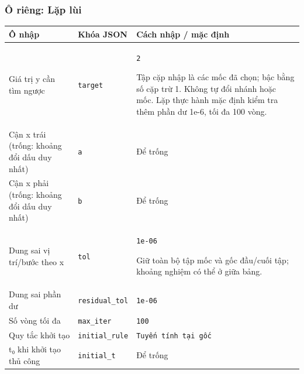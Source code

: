 \subsubsection*{Ô riêng: Lặp lùi}
\begin{center}\small\begin{tabular}{@{}p{.32\linewidth}p{.17\linewidth}p{.43\linewidth}@{}}\toprule
Ô nhập & Khóa JSON & Cách nhập / mặc định\\\midrule
Giá trị y cần tìm ngược & \texttt{target} & \texttt{2}
\par Tập cặp nhập là các mốc đã chọn;\allowbreak{} bậc bằng số cặp trừ 1. Không tự đổi nhánh hoặc mốc. Lặp thực hành mặc định kiểm tra thêm phần dư 1e-6,\allowbreak{} tối đa 100 vòng.\\[3pt]
Cận x trái (trống: khoảng đổi dấu duy nhất) & \texttt{a} & Để trống\\[3pt]
Cận x phải (trống: khoảng đổi dấu duy nhất) & \texttt{b} & Để trống\\[3pt]
Dung sai vị trí/\allowbreak{}bước theo x & \texttt{tol} & \texttt{1e-06}
\par Giữ toàn bộ tập mốc và gốc đầu/\allowbreak{}cuối tập;\allowbreak{} khoảng nghiệm có thể ở giữa bảng.\\[3pt]
Dung sai phần dư & \texttt{residual\_tol} & \texttt{1e-06}\\[3pt]
Số vòng tối đa & \texttt{max\_iter} & \texttt{100}\\[3pt]
Quy tắc khởi tạo & \texttt{initial\_rule} & \texttt{Tuyến tính tại gốc}\\[3pt]
t₀ khi khởi tạo thủ công & \texttt{initial\_t} & Để trống\\[3pt]
\bottomrule\end{tabular}\end{center}
